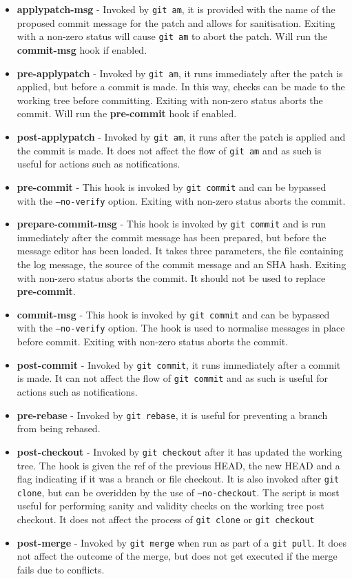 \begin{itemize}
\item\textbf{applypatch-msg} - Invoked by \texttt{git am}, it is provided with the name of the proposed commit message for the patch and allows for sanitisation.
Exiting with a non-zero status will cause \texttt{git am} to abort the patch.
Will run the \textbf{commit-msg} hook if enabled.
\item\textbf{pre-applypatch} - Invoked by \texttt{git am}, it runs immediately after the patch is applied, but before a commit is made.
In this way, checks can be made to the working tree before committing.
Exiting with non-zero status aborts the commit.
Will run the \textbf{pre-commit} hook if enabled.
\item\textbf{post-applypatch} - Invoked by \texttt{git am}, it runs after the patch is applied and the commit is made.
It does not affect the flow of \texttt{git am} and as such is useful for actions such as notifications.
\item\textbf{pre-commit} - This hook is invoked by \texttt{git commit} and can be bypassed with the \texttt{--no-verify} option.
Exiting with non-zero status aborts the commit.
\item\textbf{prepare-commit-msg} - This hook is invoked by \texttt{git commit} and is run immediately after the commit message has been prepared, but before the message editor has been loaded.
It takes three parameters, the file containing the log message, the source of the commit message and an SHA hash.
Exiting with non-zero status aborts the commit.
It should not be used to replace \textbf{pre-commit}.
\item\textbf{commit-msg} - This hook is invoked by \texttt{git commit} and can be bypassed with the \texttt{--no-verify} option.
The hook is used to normalise messages in place before commit.
Exiting with non-zero status aborts the commit.
\item\textbf{post-commit} - Invoked by \texttt{git commit}, it runs immediately after a commit is made.
It can not affect the flow of \texttt{git commit} and as such is useful for actions such as notifications.
\item\textbf{pre-rebase} - Invoked by \texttt{git rebase}, it is useful for preventing a branch from being rebased.
\item\textbf{post-checkout} - Invoked by \texttt{git checkout} after it has updated the working tree.
The hook is given the ref of the previous HEAD, the new HEAD and a flag indicating if it was a branch or file checkout.
It is also invoked after \texttt{git clone}, but can be overidden by the use of \texttt{--no-checkout}.
The script is most useful for performing sanity and validity checks on the working tree post checkout.
It does not affect the process of \texttt{git clone} or \texttt{git checkout}
\item\textbf{post-merge} - Invoked by \texttt{git merge} when run as part of a \texttt{git pull}.
It does not affect the outcome of the merge, but does not get executed if the merge fails due to conflicts.
\end{itemize}

